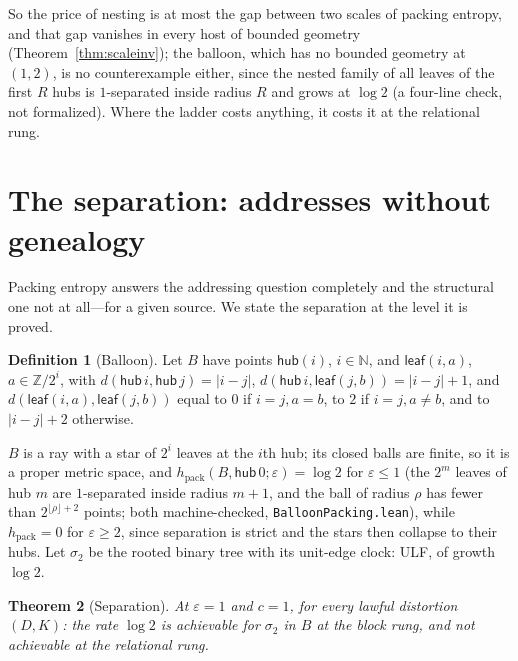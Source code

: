 \documentclass[11pt,reqno]{amsart}
\theoremstyle{plain}
\newtheorem{theorem}{Theorem}[section]
\theoremstyle{definition}
\newtheorem{definition}[theorem]{Definition}
\newcommand{\hpack}{h_{\mathrm{pack}}}
\newcommand{\eps}{\varepsilon}
\begin{document}
So the price of nesting is at most the gap between two scales of packing entropy, and that gap vanishes in every host of bounded geometry (Theorem~\ref{thm:scaleinv}); the balloon, which has no bounded geometry at $(1,2)$, is no counterexample either, since the nested family of all leaves of the first $R$ hubs is $1$-separated inside radius $R$ and grows at $\log2$ (a four-line check, not formalized). Where the ladder costs anything, it costs it at the relational rung.

\section{The separation: addresses without genealogy}\label{sec:balloon}

Packing entropy answers the addressing question completely and the structural one not at all---for a given source. We state the separation at the level it is proved.

\begin{definition}[Balloon]
Let $B$ have points $\mathsf{hub}(i)$, $i\in\mathbb N$, and $\mathsf{leaf}(i,a)$, $a\in\mathbb Z/2^i$, with $d(\mathsf{hub}\,i,\mathsf{hub}\,j)=|i-j|$, $d(\mathsf{hub}\,i,\mathsf{leaf}(j,b))=|i-j|+1$, and $d(\mathsf{leaf}(i,a),\mathsf{leaf}(j,b))$ equal to $0$ if $i=j,a=b$, to $2$ if $i=j,a\ne b$, and to $|i-j|+2$ otherwise.
\end{definition}

$B$ is a ray with a star of $2^i$ leaves at the $i$th hub; its closed balls are finite, so it is a proper metric space, and $\hpack(B,\mathsf{hub}\,0;\eps)=\log2$ for $\eps\le1$ (the $2^m$ leaves of hub $m$ are $1$-separated inside radius $m+1$, and the ball of radius $\rho$ has fewer than $2^{\lfloor\rho\rfloor+2}$ points; both machine-checked, \texttt{BalloonPacking.lean}), while $\hpack=0$ for $\eps\ge2$, since separation is strict and the stars then collapse to their hubs. Let $\sigma_2$ be the rooted binary tree with its unit-edge clock: ULF, of growth $\log2$.

\begin{theorem}[Separation]\label{thm:sep}
At $\eps=1$ and $c=1$, for every lawful distortion $(D,K)$: the rate $\log2$ is achievable for $\sigma_2$ in $B$ at the block rung, and not achievable at the relational rung.
\end{theorem}
\end{document}
